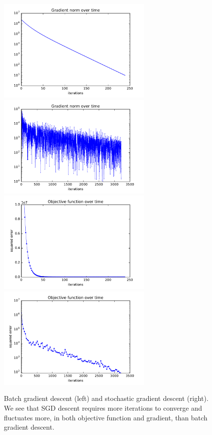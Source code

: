 \documentclass{article}
\begin{document}
\begin{multicols}{2}
\begin{figure}%
   \centering
   \includegraphics[width=3in]{img/1-1-batch.pdf}  %
   \includegraphics[width=3in]{img/1-1-stoch.pdf}  %
   \includegraphics[width=3in]{img/1-1-batch-func.pdf}  %
   \includegraphics[width=3in]{img/1-1-stoch-func.pdf}  %
   \caption{Batch gradient descent (left) and stochastic gradient descent (right). We see that SGD descent requires more iterations to converge and fluctuates more, in both objective function and gradient, than batch gradient descent.}
   \label{fig:1.2}
\end{figure}



\end{multicols}
\end{document}
